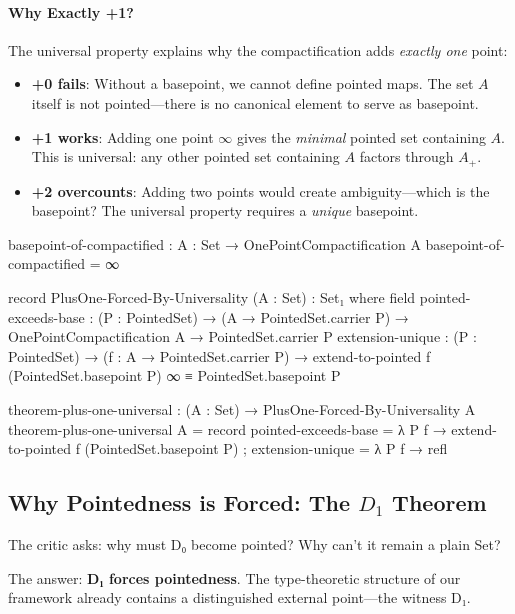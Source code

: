 \documentclass[11pt,a4paper]{book}
\begin{document}
\paragraph{Why Exactly +1?}
The universal property explains why the compactification adds \emph{exactly one} point:
\begin{itemize}
\item \textbf{+0 fails}: Without a basepoint, we cannot define pointed maps. The set 
$A$ itself is not pointed---there is no canonical element to serve as basepoint.
\item \textbf{+1 works}: Adding one point $\infty$ gives the \emph{minimal} pointed set 
containing $A$. This is universal: any other pointed set containing $A$ factors through $A_+$.
\item \textbf{+2 overcounts}: Adding two points would create ambiguity---which is the 
basepoint? The universal property requires a \emph{unique} basepoint.
\end{itemize}

\begin{code}
basepoint-of-compactified : {A : Set} → OnePointCompactification A
basepoint-of-compactified = ∞

record PlusOne-Forced-By-Universality (A : Set) : Set₁ where
  field
    pointed-exceeds-base : (P : PointedSet) → (A → PointedSet.carrier P) 
                         → OnePointCompactification A → PointedSet.carrier P
    extension-unique : (P : PointedSet) → (f : A → PointedSet.carrier P) 
                     → extend-to-pointed f (PointedSet.basepoint P) ∞ ≡ PointedSet.basepoint P

theorem-plus-one-universal : (A : Set) → PlusOne-Forced-By-Universality A
theorem-plus-one-universal A = record
  { pointed-exceeds-base = λ P f → extend-to-pointed f (PointedSet.basepoint P)
  ; extension-unique = λ P f → refl
  }
\end{code}

\subsection[Why Pointedness is Forced: The D1 Theorem]{Why Pointedness is Forced: The $D_1$ Theorem}

The critic asks: why must D₀ become pointed? Why can't it remain a plain Set?

The answer: \textbf{D₁ forces pointedness}. The type-theoretic structure of our 
framework already contains a distinguished external point---the witness D₁.
\end{document}
